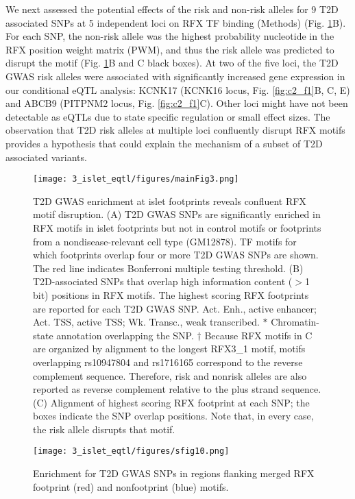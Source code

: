 We next assessed the potential effects of the risk and non-risk alleles for 9 T2D associated SNPs at 5 independent loci on RFX TF binding (Methods) (Fig. \ref{fig:c2_f3}B). For each SNP, the non-risk allele was the highest probability nucleotide in the RFX position weight matrix (PWM), and thus the risk allele was predicted to disrupt the motif (Fig. \ref{fig:c2_f3}B and C black boxes). At two of the five loci, the T2D GWAS risk alleles were associated with significantly increased gene expression in our conditional eQTL analysis: KCNK17 (KCNK16 locus, Fig. \ref{fig:c2_f1}B, C, E) and ABCB9 (PITPNM2 locus, Fig. \ref{fig:c2_f1}C). Other loci might have not been detectable as eQTLs due to state specific regulation or small effect sizes. The observation that T2D risk alleles at multiple loci confluently disrupt RFX motifs provides a hypothesis that could explain the mechanism of a subset of T2D associated variants.

\begin{figure}
    \centering
    \texttt{[image: 3\_islet\_eqtl/figures/mainFig3.png]}
    \caption[T2D GWAS enrichment at islet footprints reveals confluent RFX motif disruption]{T2D GWAS enrichment at islet footprints reveals confluent RFX motif disruption. (A) T2D GWAS SNPs are significantly enriched in RFX motifs in islet footprints but not in control motifs or footprints from a nondisease-relevant cell type (GM12878). TF motifs for which footprints overlap four or more T2D GWAS SNPs are shown. The red line indicates Bonferroni multiple testing threshold. (B) T2D-associated SNPs that overlap high information content ($>$1 bit) positions in RFX motifs. The highest scoring RFX footprints are reported for each T2D GWAS SNP. Act. Enh., active enhancer; Act. TSS, active TSS; Wk. Transc., weak transcribed. $\ast$ Chromatin-state annotation overlapping the SNP. $\dagger$ Because RFX motifs in C are organized by alignment to the longest RFX3\_1 motif, motifs overlapping rs10947804 and rs1716165 correspond to the reverse complement sequence. Therefore, risk and nonrisk alleles are also reported as reverse complement relative to the plus strand sequence. (C) Alignment of highest scoring RFX footprint at each SNP; the boxes indicate the SNP overlap positions. Note that, in every case, the risk allele disrupts that motif.}
    \label{fig:c2_f3}
\end{figure}

\begin{figure}
    \centering
    \texttt{[image: 3\_islet\_eqtl/figures/sfig10.png]}
    \caption{Enrichment for T2D GWAS SNPs in regions flanking merged RFX footprint (red) and nonfootprint (blue) motifs.}
    \label{fig:c2_sf10}
  \end{figure}
  

